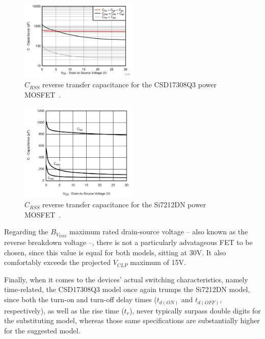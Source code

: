 \begin{figure}[h]
	\centering
	\includegraphics[width=0.5\textwidth]{Chapters/Figures/chapter3/CSD17308Q3_Crss.png}
	\caption{$C_{RSS}$ reverse transfer capacitance for the CSD17308Q3 power MOSFET~\cite{CSD17308Q3}.}
	\label{fig:CSD17308Q3_crss}
\end{figure}
\begin{figure}[h]
	\centering
	\includegraphics[width=0.5\textwidth]{Chapters/Figures/chapter3/Si7212DN_Crss.png}
	\caption{$C_{RSS}$ reverse transfer capacitance for the Si7212DN power MOSFET~\cite{Si7212DN}.}
	\label{fig:Si7212DN_crss}
\end{figure}

Regarding the $B_{V_{DSS}}$ maximum rated drain-source voltage -- also known as the reverse breakdown voltage --, there is not a particularly advatageous FET to be chosen, since this value is equal for both models, sitting at 30V. It also comfortably exceeds the projected $V_{CLP}$ maximum of 15V.

Finally, when it comes to the devices' actual switching characteristics, namely time-related, the CSD17308Q3 model once again trumps the Si7212DN model, since both the turn-on and turn-off delay times ($t_{d(ON)}$ and $t_{d(OFF)}$, respectively), as well as the rise time ($t_r$), never typically surpass double digits for the substituting model, whereas those same specifications are substantially higher for the suggested model.

